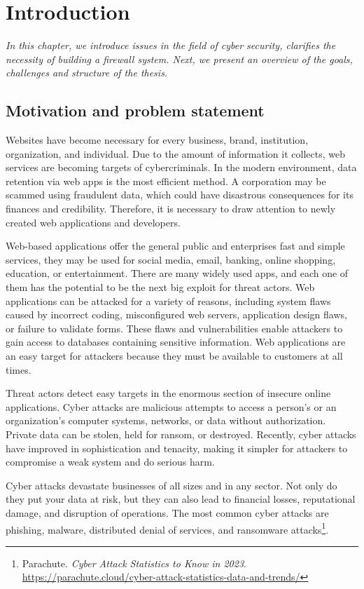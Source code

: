 \chapter{Introduction}
\label{chap:introduction}
	\textit{In this chapter, we introduce issues in the field of cyber security, clarifies the necessity of building a firewall system. Next, we present an overview of the goals, challenges and structure of the thesis.}
\minitoc

\section{Motivation and problem statement}
\label{sec:motivation}
Websites have become necessary for every business, brand, institution, organization, and individual. Due to the amount of information it collects, web services are becoming targets of cybercriminals. In the modern environment, data retention via web apps is the most efficient method. A corporation may be scammed using fraudulent data, which could have disastrous consequences for its finances and credibility. Therefore, it is necessary to draw attention to newly created web applications and developers.

Web-based applications offer the general public and enterprises fast and simple services, they may be used for social media, email, banking, online shopping, education, or entertainment. There are many widely used apps, and each one of them has the potential to be the next big exploit for threat actors. Web applications can be attacked for a variety of reasons, including system flaws caused by incorrect coding, misconfigured web servers, application design flaws, or failure to validate forms. These flaws and vulnerabilities enable attackers to gain access to databases containing sensitive information. Web applications are an easy target for attackers because they must be available to customers at all times.

Threat actors detect easy targets in the enormous section of insecure online applications. Cyber attacks are malicious attempts to access a person's or an organization's computer systems, networks, or data without authorization. Private data can be stolen, held for ransom, or destroyed. Recently, cyber attacks have improved in sophistication and tenacity, making it simpler for attackers to compromise a weak system and do serious harm.

Cyber attacks devastate businesses of all sizes and in any sector. Not only do they put your data at risk, but they can also lead to financial losses, reputational damage, and disruption of operations. The most common cyber attacks are phishing, malware, distributed denial of services, and ransomware attacks\footnote{Parachute. \textit{Cyber Attack Statistics to Know in 2023}. \url{https://parachute.cloud/cyber-attack-statistics-data-and-trends/}}. 

